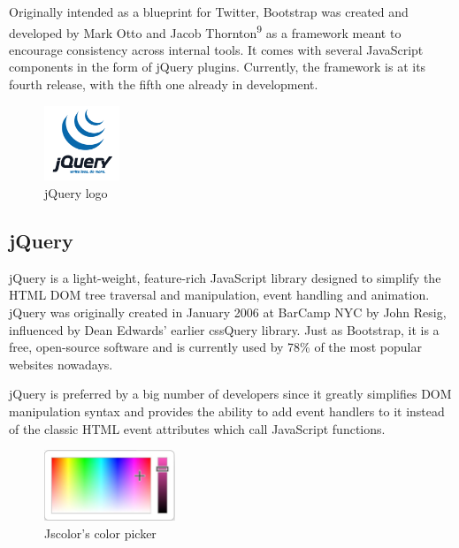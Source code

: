\documentclass{report}
\begin{document}
Originally intended as a blueprint for Twitter, Bootstrap was created and developed by Mark Otto and Jacob Thornton\textsuperscript{9} as a framework meant to encourage consistency across internal tools. It comes with several JavaScript components in the form of jQuery plugins. Currently, the framework is at its fourth release, with the fifth one already in development.

\begin{figure}
	\vspace*{-0.5cm}
    \centering
    \includegraphics[width=0.2\textwidth]{jquery}
    \caption{jQuery logo}
	\vspace{-10pt} 
\end{figure}
\subsection {jQuery}
jQuery is a light-weight, feature-rich JavaScript library designed to simplify the HTML DOM tree traversal and manipulation, event handling and animation. jQuery was originally created in January 2006 at BarCamp NYC by John Resig, influenced by Dean Edwards' earlier cssQuery library. Just as Bootstrap, it is a free,  open-source software and is currently used by 78\% of the most popular websites nowadays. \par
jQuery is preferred by a big number of developers since it greatly simplifies DOM manipulation syntax and provides the ability to add event handlers to it instead of the classic HTML event attributes which call JavaScript functions.

\begin{figure}
	\vspace*{-0.5cm}
    \centering
    \includegraphics[width=0.35\textwidth]{picker}
	\caption{Jscolor's color picker}
	\vspace{-5pt} 
\end{figure}
\end{document}
